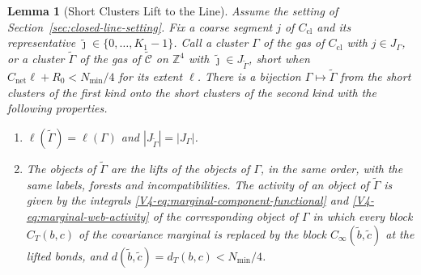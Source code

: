 \documentclass[11pt]{article}
\numberwithin{equation}{section}
\newtheorem{lemma}[theorem]{Lemma}
\theoremstyle{remark}
\theoremstyle{plain}
\begin{document}
\begin{lemma}[Short Clusters Lift to the Line]\label{lem:closed-line-lift}
Assume the setting of Section~\ref{sec:closed-line-setting}. Fix a coarse segment $j$ of $C_{\mathrm{cl}}$ and its representative $\tilde\jmath\in\{0,\ldots,K_1-1\}$. Call a cluster $\Gamma$ of the gas of $C_{\mathrm{cl}}$ with $j\in J_{\Gamma}$, or a cluster $\widetilde\Gamma$ of the gas of $\widetilde{\mathcal C}$ on $\mathbb Z^4$ with $\tilde\jmath\in J_{\widetilde\Gamma}$, \emph{short} when $C_{\mathrm{net}}\ell+R_0< N_{\min}/4$ for its extent $\ell$. There is a bijection $\Gamma\mapsto\widetilde\Gamma$ from the short clusters of the first kind onto the short clusters of the second kind with the following properties.
\begin{enumerate}[label=(\alph*)]
    \item $\ell(\widetilde\Gamma)=\ell(\Gamma)$ and $| J_{\widetilde\Gamma}|=| J_{\Gamma}|$.
    \item The objects of $\widetilde\Gamma$ are the lifts of the objects of $\Gamma$, in the same order, with the same labels, forests and incompatibilities. The activity of an object of $\widetilde\Gamma$ is given by the integrals \eqref{V4-eq:marginal-component-functional} and \eqref{V4-eq:marginal-web-activity} of the corresponding object of $\Gamma$ in which every block $C_T(b,c)$ of the covariance marginal is replaced by the block $C_{\infty}(\tilde b,\tilde c)$ at the lifted bonds, and $d(\tilde b,\tilde c)= d_T(b,c)< N_{\min}/4$.
\end{enumerate}
\end{lemma}
\end{document}
